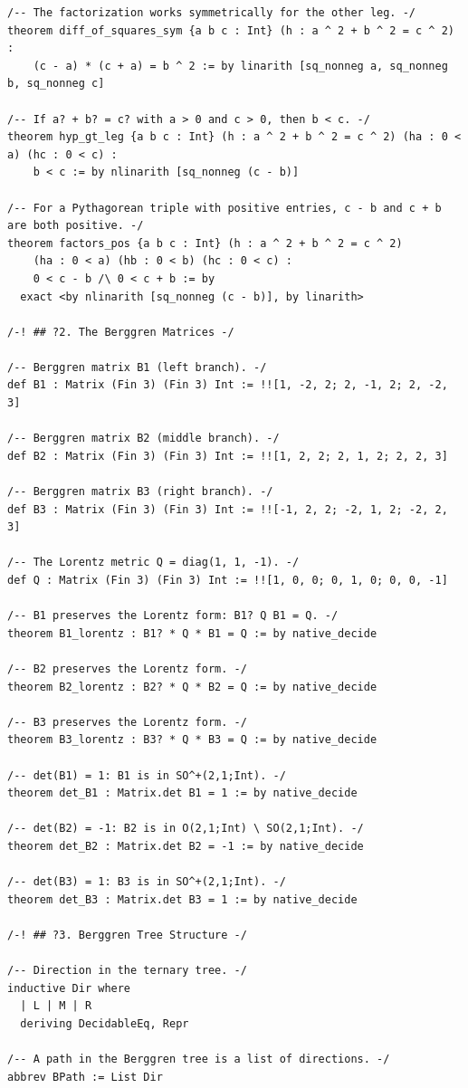 \documentclass[11pt,twoside,openright]{book}
\theoremstyle{definition}
\theoremstyle{remark}
\begin{document}
\begin{lstlisting}[style=lean]
/-- The factorization works symmetrically for the other leg. -/
theorem diff_of_squares_sym {a b c : Int} (h : a ^ 2 + b ^ 2 = c ^ 2) :
    (c - a) * (c + a) = b ^ 2 := by linarith [sq_nonneg a, sq_nonneg b, sq_nonneg c]

/-- If a? + b? = c? with a > 0 and c > 0, then b < c. -/
theorem hyp_gt_leg {a b c : Int} (h : a ^ 2 + b ^ 2 = c ^ 2) (ha : 0 < a) (hc : 0 < c) :
    b < c := by nlinarith [sq_nonneg (c - b)]

/-- For a Pythagorean triple with positive entries, c - b and c + b are both positive. -/
theorem factors_pos {a b c : Int} (h : a ^ 2 + b ^ 2 = c ^ 2)
    (ha : 0 < a) (hb : 0 < b) (hc : 0 < c) :
    0 < c - b /\ 0 < c + b := by
  exact <by nlinarith [sq_nonneg (c - b)], by linarith>

/-! ## ?2. The Berggren Matrices -/

/-- Berggren matrix B1 (left branch). -/
def B1 : Matrix (Fin 3) (Fin 3) Int := !![1, -2, 2; 2, -1, 2; 2, -2, 3]

/-- Berggren matrix B2 (middle branch). -/
def B2 : Matrix (Fin 3) (Fin 3) Int := !![1, 2, 2; 2, 1, 2; 2, 2, 3]

/-- Berggren matrix B3 (right branch). -/
def B3 : Matrix (Fin 3) (Fin 3) Int := !![-1, 2, 2; -2, 1, 2; -2, 2, 3]

/-- The Lorentz metric Q = diag(1, 1, -1). -/
def Q : Matrix (Fin 3) (Fin 3) Int := !![1, 0, 0; 0, 1, 0; 0, 0, -1]

/-- B1 preserves the Lorentz form: B1? Q B1 = Q. -/
theorem B1_lorentz : B1? * Q * B1 = Q := by native_decide

/-- B2 preserves the Lorentz form. -/
theorem B2_lorentz : B2? * Q * B2 = Q := by native_decide

/-- B3 preserves the Lorentz form. -/
theorem B3_lorentz : B3? * Q * B3 = Q := by native_decide

/-- det(B1) = 1: B1 is in SO^+(2,1;Int). -/
theorem det_B1 : Matrix.det B1 = 1 := by native_decide

/-- det(B2) = -1: B2 is in O(2,1;Int) \ SO(2,1;Int). -/
theorem det_B2 : Matrix.det B2 = -1 := by native_decide

/-- det(B3) = 1: B3 is in SO^+(2,1;Int). -/
theorem det_B3 : Matrix.det B3 = 1 := by native_decide

/-! ## ?3. Berggren Tree Structure -/

/-- Direction in the ternary tree. -/
inductive Dir where
  | L | M | R
  deriving DecidableEq, Repr

/-- A path in the Berggren tree is a list of directions. -/
abbrev BPath := List Dir


\end{lstlisting}
\end{document}
